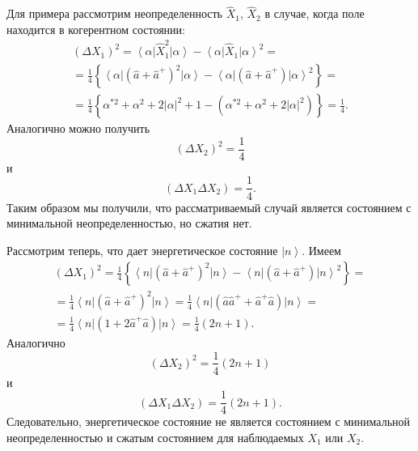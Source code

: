Для примера рассмотрим неопределенность $\hat{X}_1$, 
$\hat{X}_2$ в случае, когда поле находится в когерентном состоянии:
\begin{eqnarray}
\left(\Delta X_1\right)^2 = 
\left<\alpha\right|\hat{X}_1^2\left|\alpha\right> - 
\left<\alpha\right|\hat{X}_1\left|\alpha\right>^2 = 
\nonumber \\
=\frac{1}{4}
\left\{
\left<\alpha\right|\left(\hat{a} +
\hat{a}^{+}\right)^2\left|\alpha\right> -  
\left<\alpha\right|\left(\hat{a} +
\hat{a}^{+}\right)\left|\alpha\right>^2 
\right\} = 
\nonumber \\
=\frac{1}{4}
\left\{
\alpha^{*2} + \alpha^2 + 2 \left|\alpha\right|^2 + 1 - 
\left(\alpha^{*2} + \alpha^2 + 2 \left|\alpha\right|^2\right)
\right\} 
=\frac{1}{4}.
\nonumber
\end{eqnarray}
Аналогично можно получить
\begin{equation}
\left(\Delta X_2\right)^2 = \frac{1}{4}
\label{eqPart3SqueezedTaskX2Alpha_1}
\end{equation}
и
\begin{equation}
\left(\Delta X_1 \Delta X_2\right) = \frac{1}{4}.
\label{eqPart3SqueezedTaskX2Alpha_2}
\end{equation}
Таким образом мы получили, что рассматриваемый случай является
состоянием с минимальной неопределенностью, но сжатия нет.

Рассмотрим теперь, что дает энергетическое состояние
$\left|n\right>$. Имеем
\begin{eqnarray}
\left(\Delta X_1\right)^2 
=\frac{1}{4}
\left\{
\left<n\right|\left(\hat{a} +
\hat{a}^{+}\right)^2\left|n\right> -  
\left<n\right|\left(\hat{a} +
\hat{a}^{+}\right)\left|n\right>^2 
\right\} = 
\nonumber \\
=
\frac{1}{4}
\left<n\right|\left(\hat{a} +
\hat{a}^{+}\right)^2\left|n\right>
=
\frac{1}{4}
\left<n\right|\left(\hat{a}\hat{a}^{+} +
\hat{a}^{+}\hat{a}\right)\left|n\right> =
\nonumber \\
=
\frac{1}{4}
\left<n\right|\left(1 + 2
\hat{a}^{+}\hat{a}\right)\left|n\right>
=\frac{1}{4}\left(2 n + 1\right).
\nonumber
\end{eqnarray}
Аналогично
\begin{equation}
\left(\Delta X_2\right)^2 = \frac{1}{4}\left(2 n + 1\right)
\label{eqPart3SqueezedTaskX2N_1}
\end{equation}
и
\begin{equation}
\left(\Delta X_1 \Delta X_2\right) = \frac{1}{4}\left(2 n + 1\right).
\label{eqPart3SqueezedTaskX2N_2}
\end{equation}
Следовательно, энергетическое состояние не является состоянием с
минимальной неопределенностью и сжатым состоянием для наблюдаемых
$X_1$ или $X_2$.
